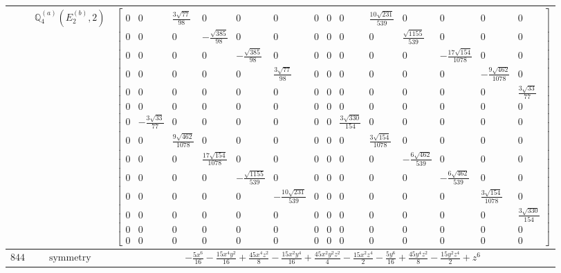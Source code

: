 \documentclass[fleqn,8pt,landscape]{jsarticle}
\begin{document}
\begin{longtable}{ccc}
$  $ & $ \mathbb{Q}_{4}^{(a)}(E_{2}^{(b)},2) $ & $ \begin{bmatrix} 0 & 0 & \frac{3 \sqrt{77}}{98} & 0 & 0 & 0 & 0 & 0 & 0 & \frac{10 \sqrt{231}}{539} & 0 & 0 & 0 & 0 \\ 0 & 0 & 0 & - \frac{\sqrt{385}}{98} & 0 & 0 & 0 & 0 & 0 & 0 & \frac{\sqrt{1155}}{539} & 0 & 0 & 0 \\ 0 & 0 & 0 & 0 & - \frac{\sqrt{385}}{98} & 0 & 0 & 0 & 0 & 0 & 0 & - \frac{17 \sqrt{154}}{1078} & 0 & 0 \\ 0 & 0 & 0 & 0 & 0 & \frac{3 \sqrt{77}}{98} & 0 & 0 & 0 & 0 & 0 & 0 & - \frac{9 \sqrt{462}}{1078} & 0 \\ 0 & 0 & 0 & 0 & 0 & 0 & 0 & 0 & 0 & 0 & 0 & 0 & 0 & \frac{3 \sqrt{33}}{77} \\ 0 & 0 & 0 & 0 & 0 & 0 & 0 & 0 & 0 & 0 & 0 & 0 & 0 & 0 \\ 0 & - \frac{3 \sqrt{33}}{77} & 0 & 0 & 0 & 0 & 0 & 0 & \frac{3 \sqrt{330}}{154} & 0 & 0 & 0 & 0 & 0 \\ 0 & 0 & \frac{9 \sqrt{462}}{1078} & 0 & 0 & 0 & 0 & 0 & 0 & \frac{3 \sqrt{154}}{1078} & 0 & 0 & 0 & 0 \\ 0 & 0 & 0 & \frac{17 \sqrt{154}}{1078} & 0 & 0 & 0 & 0 & 0 & 0 & - \frac{6 \sqrt{462}}{539} & 0 & 0 & 0 \\ 0 & 0 & 0 & 0 & - \frac{\sqrt{1155}}{539} & 0 & 0 & 0 & 0 & 0 & 0 & - \frac{6 \sqrt{462}}{539} & 0 & 0 \\ 0 & 0 & 0 & 0 & 0 & - \frac{10 \sqrt{231}}{539} & 0 & 0 & 0 & 0 & 0 & 0 & \frac{3 \sqrt{154}}{1078} & 0 \\ 0 & 0 & 0 & 0 & 0 & 0 & 0 & 0 & 0 & 0 & 0 & 0 & 0 & \frac{3 \sqrt{330}}{154} \\ 0 & 0 & 0 & 0 & 0 & 0 & 0 & 0 & 0 & 0 & 0 & 0 & 0 & 0 \\ 0 & 0 & 0 & 0 & 0 & 0 & 0 & 0 & 0 & 0 & 0 & 0 & 0 & 0 \end{bmatrix} $ \\ \hline
$ 844 $ & $ \text{symmetry} $ & $ - \frac{5 x^{6}}{16} - \frac{15 x^{4} y^{2}}{16} + \frac{45 x^{4} z^{2}}{8} - \frac{15 x^{2} y^{4}}{16} + \frac{45 x^{2} y^{2} z^{2}}{4} - \frac{15 x^{2} z^{4}}{2} - \frac{5 y^{6}}{16} + \frac{45 y^{4} z^{2}}{8} - \frac{15 y^{2} z^{4}}{2} + z^{6} $ \\

\end{longtable}
\end{document}
